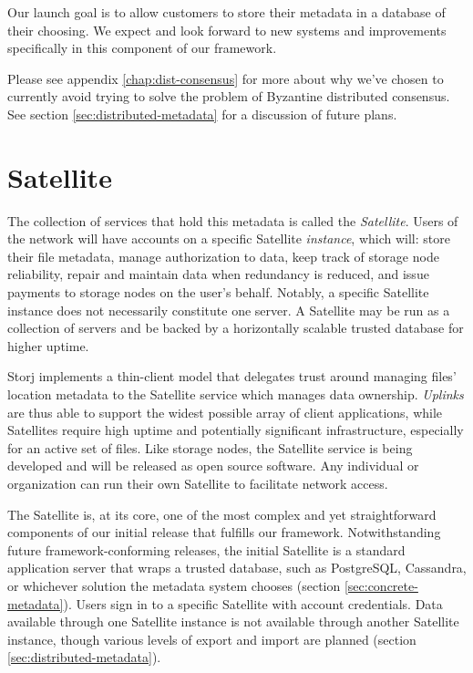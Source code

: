 \documentclass[8pt,fleqn,openany]{book}
\begin{document}
Our launch goal is to allow customers to store their metadata in a database of
their choosing. We expect and look forward to new systems and improvements
specifically in this component of our framework.

Please see appendix \ref{chap:dist-consensus} for more about why we've chosen
to currently avoid trying to solve the problem of Byzantine distributed consensus.
See section \ref{sec:distributed-metadata} for a discussion of future plans.

\section{Satellite}

The collection of services that hold this metadata is called the
{\em Satellite}. Users of the network will have accounts on a specific
Satellite {\em instance}, which will: store their file metadata, manage authorization
to data, keep track of storage node reliability, repair and maintain data when
redundancy is reduced, and issue payments to storage nodes on the user's behalf.
Notably, a specific Satellite instance does not necessarily constitute one
server. A Satellite may be run as a collection of servers and be backed by
a horizontally scalable trusted database for higher uptime.

Storj implements a thin-client model that delegates trust around managing
files' location metadata to the Satellite service which manages data
ownership. {\em Uplinks}
are thus able to support the widest possible array of client applications, while
Satellites require high uptime and potentially significant infrastructure,
especially for an active set of files.
Like storage nodes,
the Satellite service is being developed and will be released as open source software.
Any individual or organization can run their own Satellite to facilitate
network access.

The Satellite is, at its core, one of the most complex and yet
straightforward components of our initial release that fulfills our framework.
Notwithstanding future framework-conforming releases, the initial Satellite
is a standard application server that wraps a trusted database, such as
PostgreSQL, Cassandra, or whichever solution the metadata system chooses
(section \ref{sec:concrete-metadata}). Users sign in to a specific
Satellite with account credentials.
Data available through one Satellite instance is
not available through another Satellite instance, though various levels of
export and import are planned (section \ref{sec:distributed-metadata}).
\end{document}
